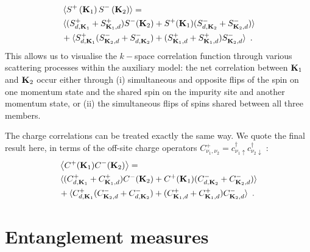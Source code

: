 \documentclass[reprint,hidelinks]{revtex4-2}
\begin{document}
\begin{equation}\begin{aligned}
	&\braket{S^+\left({\bf K}_1\right)S^-\left({\bf K}_2\right)} =\\
	& \braket{(S^+_{d, {\bf K}_1} + S^+_{{\bf K}_1,d}) S^-({\bf K}_2) + S^+({\bf K}_1) (S^-_{d, {\bf K}_2} + S^-_{{\bf K}_2, d})} \\
	&+ \braket{S^+_{d, {\bf K}_1} (S^-_{{\bf K}_2, d} + S^-_{d, {\bf K}_2}) + (S^+_{{\bf K}_1, d} + S^+_{{\bf K}_1, d}) S^-_{{\bf K}_2, d}}~.
\end{aligned}\end{equation}
This allows us to visualise the \(k-\)space correlation function through various scattering processes within the auxiliary model: the net correlation between \({\bf K}_1\) and \({\bf K}_2\) occur either through (i) simultaneous and opposite flips of the spin on one momentum state and the shared spin on the impurity site and another momentum state, or (ii) the simultaneous flips of spins shared between all three members.

The charge correlations can be treated exactly the same way. We quote the final result here, in terms of the off-site charge operators \(C^+_{\nu_1, \nu_2} = c^\dagger_{\nu_1 \uparrow} c^\dagger_{\nu_2 \downarrow}\) :
\begin{equation}\begin{aligned}
	&\left<C^+({\bf K}_1) C^-({\bf K}_2)\right> = \\
	& \braket{(C^+_{d, {\bf K}_1} + C^+_{{\bf K}_1,d}) C^-({\bf K}_2) + C^+({\bf K}_1) (C^-_{d, {\bf K}_2} + C^-_{{\bf K}_2, d})}\\
	&+ \braket{C^+_{d, {\bf K}_1} (C^-_{{\bf K}_2, d} + C^-_{d, {\bf K}_2}) + (C^+_{{\bf K}_1, d} + C^+_{{\bf K}_1, d}) C^-_{{\bf K}_2, d}}~.
\end{aligned}\end{equation}



\section{Entanglement measures}
\end{document}

